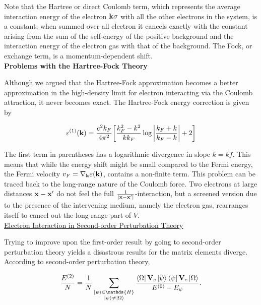 \documentclass{homework}
\begin{document}
Note that the Hartree or direct Coulomb term, which represents the average interaction energy of the electron ${\bf k}\sigma$ with all the other electrons in the system, is a constant; when summed over all electron it cancels exactly with the constant arising from the sum of the self-energy of the positive background and the interaction energy of the electron gas with that of the background. The Fock, or exchange term, is a momentum-dependent shift. \\

\textbf{Problems with the Hartree-Fock Theory}

Although we argued that the Hartree-Fock approximation becomes a better approximation in the high-density limit for electron interacting via the Coulomb attraction, it never becomes exact. The Hartree-Fock energy correction is given by 

$$
    \varepsilon^{(1)}({\bf k}) = \frac{e^2 k_F}{4\pi^2} \bigg[\frac{k_F^2 - k^2}{kk_F} \log \bigg| \frac{k_F + k}{k_F - k}\bigg| + 2\bigg]
$$

The first term in parentheses has a logarithmic divergence in slope $k=kf$. This means that while the energy shift might be small compared to the Fermi energy, the Fermi velocity $v_F = \nabla_{{\bf k}} \varepsilon({\bf k})$, contains a non-finite term. This problem can be traced back to the long-range nature of the Coulomb force. Two electrons at large distances ${\bf x}-{\bf x}'$ do not feel the full $\frac{1}{|{\bf x}-{\bf x}'|}$-interaction, but a screened version due to the presence of the intervening medium, namely the electron gas, rearranges itself to cancel out the long-range part of $V$. \\

\underline{Electron Interaction in Second-order Perturbation Theory}

Trying to improve upon the first-order result by going to second-order perturbation theory yields a disastrous results for the matrix elements diverge. According to second-order perturbation theory, 

\begin{equation}
\frac{E^{(2)}}{N} = \frac{1}{N} \sum_{\substack{\ket{\psi} \in \mathds{H} \\
\ket{\psi} \neq \ket{\Omega}}} \frac{\bra{\Omega} {{\bf V}}_c \ket{\psi} \bra{\psi} {{\bf V}}_c \ket{\Omega}}{E^{(0)} - E_\psi}.
\end{equation}
\end{document}
